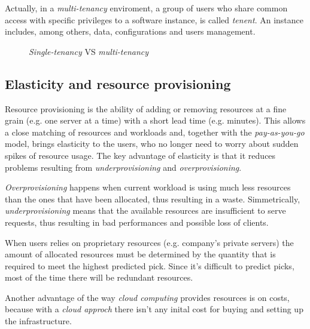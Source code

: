 Actually, in a \emph{multi-tenancy} enviroment, a group of users who share
common access with specific privileges to a software instance, is called
\emph{tenent}. An instance includes, among others, data, configurations and
users management.

\newpage
\begin{figure}[ht!]
    \centering
    \hspace{2mm}
    \hspace{2mm}
    \caption{\emph{Single-tenancy} VS \emph{multi-tenancy}}
\end{figure}

\subsection{Elasticity and resource provisioning}
Resource provisioning is the ability of adding or removing resources at a fine
grain (e.g. one server at a time) with a short lead time (e.g. minutes). This
allows a close matching of resources and workloads and, together with the
\emph{pay-as-you-go} model, brings elasticity to the users, who no longer need
to worry about sudden spikes of resource usage. The key advantage of elasticity
is that it reduces problems resulting from \emph{underprovisioning} and
\emph{overprovisioning}.

\emph{Overprovisioning} happens when current workload is using much less resources
than the ones that have been allocated, thus resulting in a waste.
Simmetrically, \emph{underprovisioning} means that the available resources are
insufficient to serve requests, thus resulting in bad performances and
possible loss of clients.

When users relies on proprietary resources (e.g. company's private servers) the
amount of allocated resources must be determined by the quantity that is
required to meet the highest predicted pick. Since it's difficult to predict
picks, most of the time there will be redundant resources.

Another advantage of the way \emph{cloud computing} provides resources is on costs,
because with a \emph{cloud approch} there isn't any inital cost for buying and
setting up the infrastructure.

